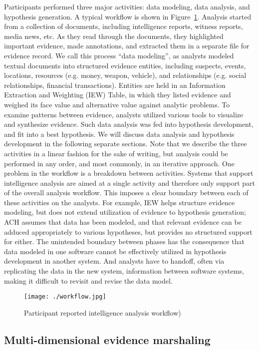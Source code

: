 Participants performed three major activities: data modeling, data analysis, and hypothesis generation. A typical workflow is shown in Figure~\ref{fig:workflow}. Analysis started from a collection of documents, including intelligence reports, witness reports, media news, etc. As they read through the documents, they highlighted important evidence, made annotations, and extracted them in a separate file for evidence record. We call this process “data modeling”, as analysts modeled textual documents into structured evidence entities, including suspects, events, locations, resources (e.g. money, weapon, vehicle), and relationships (e.g. social relationships, financial transactions). Entities are held in an Information Extraction and Weighting (IEW) Table, in which they listed evidence and weighed its face value and alternative value against analytic problems.
To examine patterns between evidence, analysts utilized various tools to visualize and synthesize evidence. Such data analysis was fed into hypothesis development, and fit into a best hypothesis. We will discuss data analysis and hypothesis development in the following separate sections. Note that we describe the three activities in a linear fashion for the sake of writing, but analysis could be performed in any order, and most commonly, in an iterative approach.
One problem in the workflow is a breakdown between activities. Systems that support intelligence analysis are aimed at a single activity and therefore only support part of the overall analysis workflow. This imposes a clear boundary between each of these activities on the analysts. For example, IEW helps structure evidence modeling, but does not extend utilization of evidence to hypothesis generation; ACH assumes that data has been modeled, and that relevant evidence can be adduced appropriately to various hypotheses, but provides no structured support for either. The unintended boundary between phases has the consequence that data modeled in one software cannot be effectively utilized in hypothesis development in another system. And analysts have to handoff, often via replicating the data in the new system, information between software systems, making it difficult to revisit and revise the data model.

\begin{figure}
\centering
\texttt{[image: ./workflow.jpg]}
\caption{Participant reported intelligence analysis workflow)\label{fig:workflow}}
\end{figure}

\subsection{Multi-dimensional evidence marshaling}

